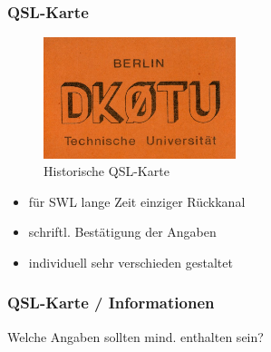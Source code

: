 \begin{frame}
  \frametitle{QSL-Karte}

  \begin{center}
    \begin{figure}
      \includegraphics[width=0.5\textwidth,height=.5\textheight,keepaspectratio]{bv13/DK0TU_0.jpg}
      \caption{Historische QSL-Karte}
    \end{figure}
  \end{center}

  \begin{itemize}
    \item für SWL lange Zeit einziger Rückkanal
    \item schriftl. Bestätigung der Angaben
    \item individuell sehr verschieden gestaltet
  \end{itemize}

\end{frame}

\begin{frame}
  \frametitle{QSL-Karte / Informationen}

  \begin{exampleblock}{Welche Angaben sollten mind. enthalten sein?}
  \end{exampleblock}


\end{frame}

